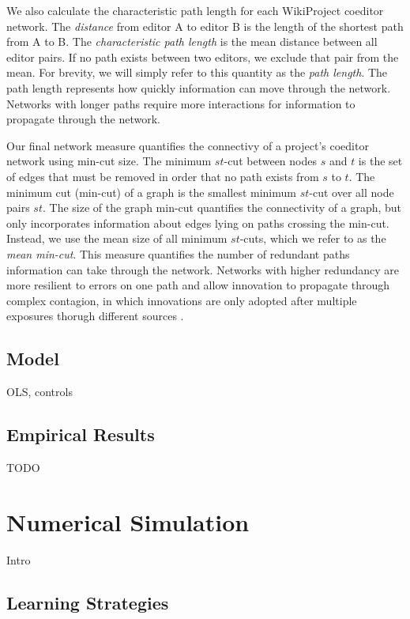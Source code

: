 \documentclass[10pt,twocolumn]{article}
\begin{document}
We also calculate the characteristic path length for each WikiProject coeditor network.
The {\em distance} from editor A to editor B is the length of the shortest path from A to B.
The {\em characteristic path length} is the mean distance between all editor pairs.
If no path exists between two editors, we exclude that pair from the mean.
For brevity, we will simply refer to this quantity as the {\em path length}.
The path length represents how quickly information can move through the network.
Networks with longer paths require more interactions for information to propagate through
the network.

Our final network measure quantifies the connectivy of a project's coeditor network using
min-cut size.
The minimum $st$-cut between nodes $s$ and $t$ is the set of edges that must be removed in order that
no path exists from $s$ to $t$.
The minimum cut (min-cut) of a graph is the smallest minimum $st$-cut over all node pairs $st$. 
The size of the graph min-cut quantifies the connectivity of a graph,
but only incorporates information about edges lying on paths crossing the min-cut.
Instead, we use the mean size of all minimum $st$-cuts, which we refer to as the
{\em mean min-cut}.
This measure quantifies the number of redundant paths information can take through the network.
Networks with higher redundancy are more resilient to errors on one path \cite{}
and allow innovation to propagate through complex contagion,
in which innovations are only adopted after multiple exposures thorugh different sources
\cite{}.

\subsection{Model}

OLS, controls

\subsection{Empirical Results}

TODO

\section{Numerical Simulation}

Intro

\subsection{Learning Strategies}
\end{document}

